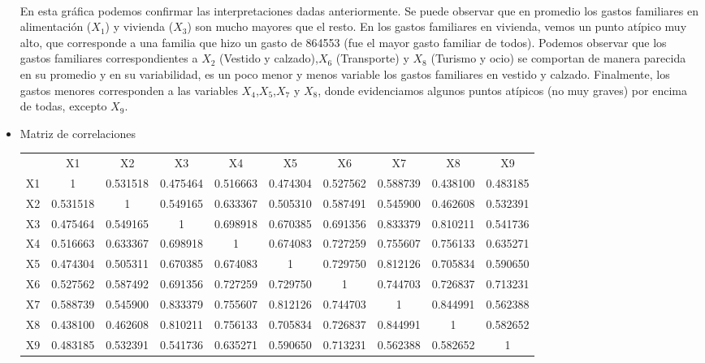 \documentclass[report,oneside]{revcoles}
\begin{document}
\begin{itemize}
~\\En esta gráfica podemos confirmar las interpretaciones dadas anteriormente. Se puede observar que en promedio los gastos familiares en alimentación ($X_1$) y vivienda ($X_3$) son mucho mayores que el resto. En los gastos familiares en vivienda, vemos un punto atípico muy alto, que corresponde a una familia que hizo un gasto de 864553 (fue el mayor gasto familiar de todos). Podemos observar que los gastos familiares correspondientes a $X_2$ (Vestido y calzado),$X_6$ (Transporte) y $X_8$ (Turismo y ocio) se comportan de manera parecida en su promedio y en su variabilidad, es un poco menor y menos variable los gastos familiares en vestido y calzado. Finalmente, los gastos menores corresponden a las variables $X_4$,$X_5$,$X_7$ y $X_8$, donde evidenciamos algunos puntos atípicos (no muy graves) por encima de todas, excepto $X_9$.

\item Matriz de correlaciones
\begin{center}
\resizebox{15cm}{!} {
\begin{tabular}{cccccccccc}
 
 & X1 & X2 & X3 & X4 & X5 & X6 & X7 & X8 & X9\\ 

X1 & 1 &0.531518& 0.475464& 0.516663& 0.474304& 0.527562& 0.588739& 0.438100& 0.483185 \\ 

X2 & 0.531518 &1& 0.549165& 0.633367& 0.505310& 0.587491& 0.545900& 0.462608& 0.532391 \\ 
 
X3 & 0.475464& 0.549165& 1& 0.698918& 0.670385& 0.691356& 0.833379& 0.810211& 0.541736 \\ 

X4 & 0.516663 &0.633367 &0.698918 &1 &0.674083 &0.727259 &0.755607 &0.756133 &0.635271 \\ 

X5 & 0.474304 &0.505311 &0.670385& 0.674083& 1& 0.729750& 0.812126& 0.705834 &0.590650 \\ 

X6 & 0.527562 &0.587492 &0.691356 &0.727259 &0.729750 &1 &0.744703 &0.726837 &0.713231 \\ 

X7 & 0.588739 &0.545900& 0.833379& 0.755607& 0.812126& 0.744703 &1& 0.844991& 0.562388 \\ 
 
X8 & 0.438100 &0.462608 &0.810211 &0.756133 &0.705834 &0.726837 &0.844991 &1 &0.582652 \\ 

X9 & 0.483185 &0.532391& 0.541736& 0.635271& 0.590650& 0.713231& 0.562388& 0.582652& 1 \\ 

\end{tabular}
} 
\end{center}
\end{itemize}
\end{document}
